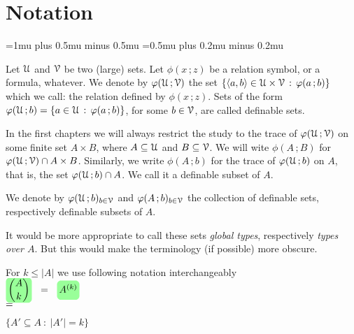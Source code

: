 \documentclass[scombinatorics.tex]{subfiles}
\begin{document}
\chapter*{Notation}

\label{minimax}


\def\medrel#1{\parbox[t]{6ex}{$\displaystyle\hfil #1$}}
\def\ceq#1#2#3{\parbox[t]{25ex}{$\displaystyle #1$}\medrel{#2}{$\displaystyle #3$}}

\thickmuskip=1mu plus 0.5mu minus 0.5mu
\medmuskip=0.5mu plus 0.2mu minus 0.2mu

Let $\EuScript U$ and $\EuScript V$ be two (large) sets.
Let $\phi(x\,;z)$ be a relation symbol, or a formula, whatever.
We denote by $\varphi(\EuScript U\,;\EuScript V)$ the set $\{\langle a,b\rangle\in\EuScript U\times\EuScript V\, :\, \varphi(a\,;b)\}$ which we call: the relation defined by $\phi(x\,;z)$.
Sets of the form $\varphi(\EuScript U\,;b)=\{a\in\EuScript U\,:\, \varphi(a\,;b)\}$, for some $b\in\EuScript V$, are called definable sets.


In the first chapters we will always restrict the study to the trace of $\varphi(\EuScript U\,;\EuScript V)$ on some finite set $A\times B$, where $A\subseteq\EuScript U$ and $B\subseteq\EuScript V$. 
We will wite $\phi(A\,;B)$ for $\varphi(\EuScript U\,;\EuScript V)\cap A\times B$.
Similarly, we write $\phi(A\,;b)$ for the trace of $\varphi(\EuScript U\,;b)$ on $A$, that is, the set $\varphi(\EuScript U\,;b)\cap A$.
We call it a definable subset of $A$.

We denote by \emph{$\varphi(\EuScript U\,;b)_{b\in\EuScript V}$} and \emph{$\varphi(A\,;b)_{b\in\EuScript V}$} the collection of definable sets, respectively definable subsets of $A$.

It would be more appropriate to call these sets \textit{global types}, respectively \textit{types over $A$}.
But this would make the terminology (if possible) more obscure.

For $k\le|A|$ we use following notation interchangeably

\ceq{\hfill\emph{$\displaystyle{A\choose k}$}\medrel{=}\emph{$\vphantom{\Big[}A^{(k)}$}}
{=}
{\Big\{A'\subseteq A\ :\ |A'|=k \Big\}}
\end{document}
